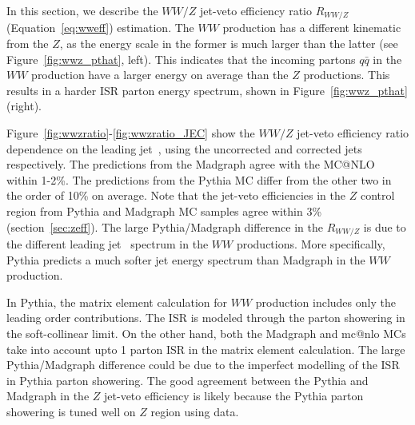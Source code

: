 In this section, we describe the $WW/Z$ jet-veto efficiency 
ratio $R_{WW/Z}$ (Equation~\ref{eq:wweff}) estimation. 
The $WW$ production has a different kinematic from the $Z$, as 
the energy scale in the former is much larger than the latter 
(see Figure~\ref{fig:wwz_pthat}, left).
This indicates that the incoming partons $q\bar{q}$ in the $WW$ 
production have a larger energy on average than the $Z$ productions. 
This results in a harder ISR parton energy spectrum, 
shown in Figure~\ref{fig:wwz_pthat} (right). 


Figure~\ref{fig:wwzratio}-\ref{fig:wwzratio_JEC} show 
the $WW/Z$ jet-veto efficiency ratio dependence on the 
leading jet \pt\,, using the uncorrected and corrected jets respectively. 
The predictions from the Madgraph agree with the MC@NLO within 1-2\%.
The predictions from the Pythia MC differ from the 
other two in the order of 10\% on average. 
Note that the jet-veto efficiencies in the $Z$ control region 
from Pythia and Madgraph MC samples agree within 3\% (section~\ref{sec:zeff}). 
The large Pythia/Madgraph difference in the $R_{WW/Z}$ 
is due to the different leading jet \pt\, spectrum in the 
$WW$ productions. 
More specifically, Pythia predicts a much softer 
jet energy spectrum than Madgraph in the $WW$ production. 

In Pythia, the matrix element calculation for $WW$ production 
includes only the leading order contributions. 
The ISR is modeled through the parton 
showering in the soft-collinear limit. 
On the other hand, both the Madgraph and mc@nlo MCs 
take into account upto 1 parton ISR in the matrix element calculation.
The large Pythia/Madgraph difference could be due to the 
imperfect modelling of the ISR in Pythia parton showering. 
The good agreement between the Pythia and Madgraph in the 
$Z$ jet-veto efficiency is likely because the Pythia parton 
showering is tuned well on $Z$ region using data. 




